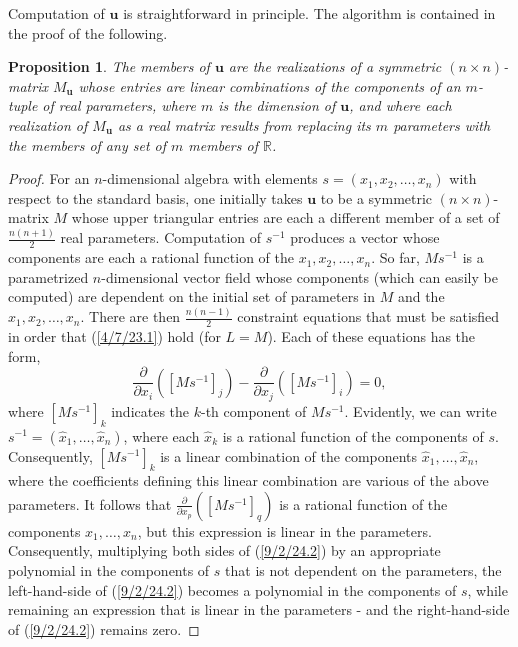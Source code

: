 \documentclass{amsart}
\numberwithin{equation}{section}
\newtheorem{proposition}[theorem]{Proposition}
\theoremstyle{definition}
\numberwithin{theorem}{section}
\begin{document}
Computation of $\mathbf{u}$ is straightforward in principle.  The algorithm is contained in the proof of the following. \enlargethispage{1.5cm}

\begin{proposition}\label{9/2/24.1} The members of $\mathbf{u}$ are the realizations of a symmetric $(n\times n)$-matrix $M_{\mathbf{u}}$ whose entries are linear combinations of the components of an $m$-tuple of real parameters, where $m$ is the dimension of $\mathbf{u}$, and where each realization of $M_{\mathbf{u}}$ as a real matrix results from replacing its $m$ parameters with the members of any set of $m$ members of $\mathbb{R}$.   
\end{proposition}

\begin{proof} For an $n$-dimensional algebra with elements $s = (x_1,x_2,\dots,x_n)$ with respect to the standard basis, one initially takes $\mathbf{u}$ to be a symmetric $(n\times n)$-matrix $M$ whose upper triangular entries are each a different member of a set of $\frac{n(n+1)}{2}$ real parameters.  Computation of $s^{-1}$ produces a vector whose components are each a rational function of the $x_1,x_2,\dots,x_n$.  So far, $Ms^{-1}$ is a parametrized \mbox{$n$-dimensional} vector field whose components (which can easily be computed) are dependent on the initial set of parameters in $M$ and the $x_1,x_2,\dots,x_n$.  There are then $\frac{n(n-1)}{2}$ constraint equations that must be satisfied in order that (\ref{4/7/23.1}) hold (for $L=M$).  Each of these equations has the form, \begin{equation}\label{9/2/24.2} \frac{\partial}{\partial x_i}([Ms^{-1}]_j) - \frac{\partial}{\partial x_j}([Ms^{-1}]_i) = 0,\end{equation} where $[Ms^{-1}]_k$ indicates the $k$-th component of $Ms^{-1}$.  Evidently, we can write $s^{-1} = (\hat{x}_1,\dots,\hat{x}_n)$, where each $\hat{x}_k$ is a rational function of the components of $s$.  Consequently, $[Ms^{-1}]_k$ is a linear combination of the components $\hat{x}_1,\dots,\hat{x}_n$, where the coefficients defining this linear combination are various of the above parameters.  It follows that $\frac{\partial}{\partial x_p}([Ms^{-1}]_q)$ is a rational function of the components $x_1,\dots,x_n$, but this expression is linear in the parameters.  Consequently, multiplying both sides of (\ref{9/2/24.2}) by an appropriate polynomial in the components of $s$ that is not dependent on the parameters, the left-hand-side of (\ref{9/2/24.2}) becomes a polynomial in the components of $s$, while remaining an expression that is linear in the parameters - and the right-hand-side of (\ref{9/2/24.2}) remains zero.

\end{proof}
\end{document}
